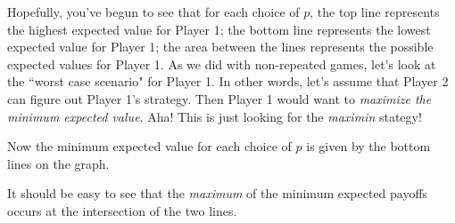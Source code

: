\begin{figure}[h]
\leavevmode
\begin{center}
{\scalebox{.65}{}}
\end{center}
\end{figure}  

Hopefully, you've begun to see that for each choice of $p$, the top line represents the highest expected value for Player 1; the bottom line represents the lowest expected value for Player 1; the area between the lines represents the possible expected values for Player 1. As we did with non-repeated games, let's look at the ``worst case scenario" for Player 1. In other words, let's assume that Player 2 can figure out Player 1's strategy. Then Player 1 would want to {\it maximize the minimum expected value}. Aha! This is just looking for the {\it maximin} stategy! 

Now the minimum expected value for each choice of $p$ is given by the bottom lines on the graph.

\begin{figure}[h]
\leavevmode
\begin{center}
{\scalebox{.65}{}}
\end{center}
\end{figure}  

It should be easy to see that the {\it maximum} of the minimum expected payoffs occurs at the intersection of the two lines.

